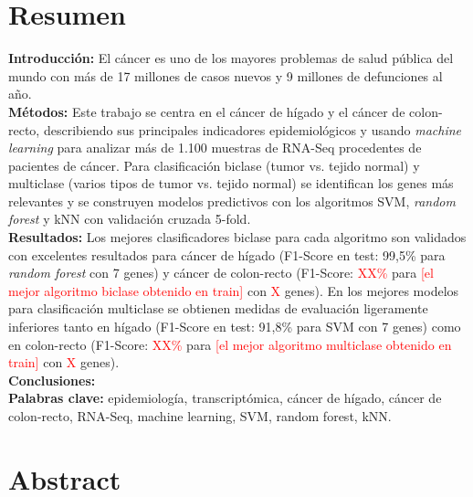 \thispagestyle{plain}


\vspace{-30pt}

\section*{Resumen}

\textbf{Introducción:} El cáncer es uno de los mayores problemas de salud pública del mundo con más de 17 millones de casos nuevos y 9 millones de defunciones al año. \\

\textbf{Métodos:} Este trabajo se centra en el cáncer de hígado y el cáncer de colon-recto, describiendo sus principales indicadores epidemiológicos y usando \textit{machine learning} para analizar más de 1.100 muestras de RNA-Seq procedentes de pacientes de cáncer. Para clasificación biclase (tumor vs. tejido normal) y multiclase (varios tipos de tumor vs. tejido normal) se identifican los genes más relevantes y se construyen modelos predictivos con los algoritmos SVM, \textit{random forest} y kNN con validación cruzada 5-fold.\\

\textbf{Resultados:} Los mejores clasificadores biclase para cada algoritmo son validados con excelentes resultados para cáncer de hígado (F1-Score en test: 99,5\% para \textit{random forest} con 7 genes) y cáncer de colon-recto (F1-Score: \textcolor{red}{XX\%} para \textcolor{red}{[el mejor algoritmo biclase obtenido en train]} con \textcolor{red}{X} genes). En los mejores modelos para clasificación multiclase se obtienen medidas de evaluación ligeramente inferiores tanto en hígado (F1-Score en test: 91,8\% para SVM con 7 genes) como en colon-recto (F1-Score: \textcolor{red}{XX\%} para \textcolor{red}{[el mejor algoritmo multiclase obtenido en train]} con \textcolor{red}{X} genes).\\

\textbf{Conclusiones:}\\

\textbf{Palabras clave:} epidemiología, transcriptómica, cáncer de hígado, cáncer de colon-recto, RNA-Seq, machine learning, SVM, random forest, kNN.

\newpage
\thispagestyle{plain}

\section*{Abstract}

